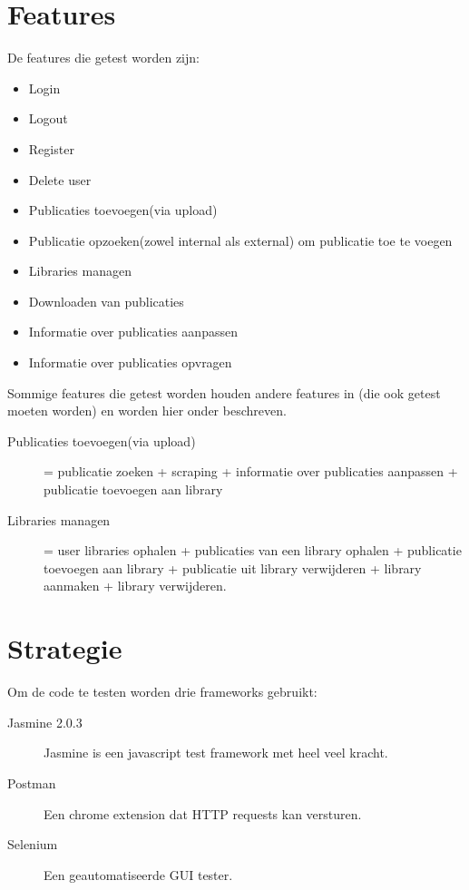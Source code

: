 \documentclass{article}
\begin{document}
\section{Features}
De features die getest worden zijn:
\begin{itemize}
  \item Login 
  \item Logout 
  \item Register
  \item Delete user
  \item Publicaties toevoegen(via upload)
  \item Publicatie opzoeken(zowel internal als external) om publicatie toe te voegen
  \item Libraries managen
  \item Downloaden van publicaties
  \item Informatie over publicaties aanpassen
  \item Informatie over publicaties opvragen
\end{itemize}
Sommige features die getest worden houden andere features in (die ook getest moeten worden) en worden hier onder beschreven.\\
\begin{description}
\item[Publicaties toevoegen(via upload)] = publicatie zoeken + scraping + informatie over publicaties aanpassen + publicatie toevoegen aan library
\item[Libraries managen] = user libraries ophalen + publicaties van een library ophalen + publicatie toevoegen aan library + publicatie uit library verwijderen + library aanmaken + library verwijderen.
\end{description}
%
\section{Strategie}
Om de code te testen worden drie frameworks gebruikt: 
\begin{description}
  \item[Jasmine 2.0.3] Jasmine is een javascript test framework met heel veel kracht.
  \item[Postman] Een chrome extension dat HTTP requests kan versturen. 
  \item[Selenium] Een geautomatiseerde GUI tester.
\end{description}
\end{document}
